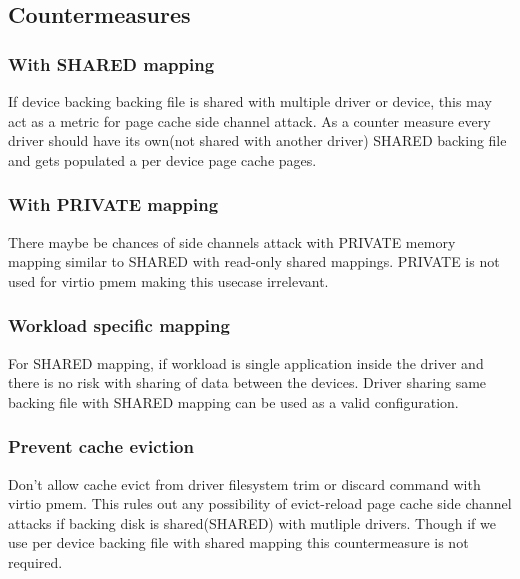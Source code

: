 \subsection{Countermeasures}\label{sec:Device Types / PMEM Device / Possible Security Implications / Countermeasures}

\subsubsection{ With SHARED mapping}\label{sec:Device Types / PMEM Device / Possible Security Implications / Countermeasures / SHARED}

If device backing backing file is shared with multiple driver or device, 
this may act as a metric for page cache side channel attack. As a counter
measure every driver should have its own(not shared with another driver)
SHARED backing file and gets populated a per device page cache pages.

\subsubsection{ With PRIVATE mapping}\label{sec:Device Types / PMEM Device / Possible Security Implications / Countermeasures / PRIVATE}
There maybe be chances of side channels attack with PRIVATE
memory mapping similar to SHARED with read-only shared mappings.
PRIVATE is not used for virtio pmem making this usecase
irrelevant.

\subsubsection{ Workload specific mapping}\label{sec:Device Types / PMEM Device / Possible Security Implications / Countermeasures / Workload}
For SHARED mapping, if workload is single application inside
the driver and there is no risk with sharing of data between the devices.
Driver sharing same backing file with SHARED mapping can be
used as a valid configuration.

\subsubsection{ Prevent cache eviction}\label{sec:Device Types / PMEM Device / Possible Security Implications / Countermeasures / Cache eviction}
Don't allow cache evict from driver filesystem trim or discard command
with virtio pmem. This rules out any possibility of evict-reload
page cache side channel attacks if backing disk is shared(SHARED)
with mutliple drivers. Though if we use per device backing file with
shared mapping this countermeasure is not required.

